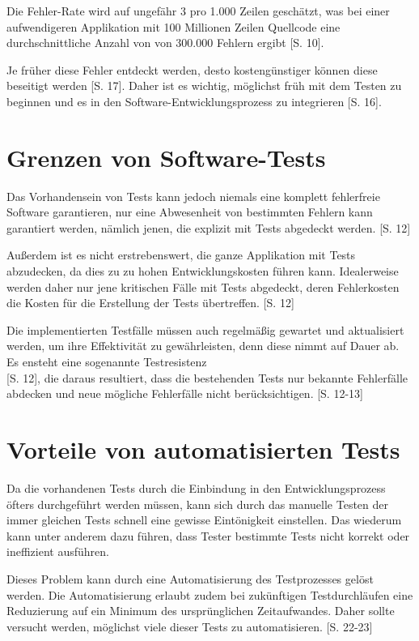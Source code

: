 \documentclass[a4paper,bibtotoc,oneside]{scrbook}
\begin{document}
Die Fehler-Rate wird auf ungefähr 3 pro 1.000 Zeilen geschätzt, was bei einer aufwendigeren Applikation mit 100 Millionen Zeilen Quellcode eine durchschnittliche Anzahl von von 300.000 Fehlern ergibt \cite{eval_regression}[S. 10]. 

Je früher diese Fehler entdeckt werden, desto kostengünstiger können diese beseitigt werden \cite{betrieb}[S. 17]. Daher ist es wichtig, möglichst früh mit dem Testen zu beginnen und es in den Software-Entwicklungsprozess zu integrieren \cite{betrieb}[S. 16]. 

\section{Grenzen von Software-Tests}
Das Vorhandensein von Tests kann jedoch niemals eine komplett fehlerfreie Software garantieren, nur eine Abwesenheit von bestimmten Fehlern kann garantiert werden, nämlich jenen, die explizit mit Tests abgedeckt werden. \cite{eval_regression}[S. 12]

Außerdem ist es nicht erstrebenswert, die ganze Applikation mit Tests abzudecken, da dies zu zu hohen Entwicklungskosten führen kann. Idealerweise werden daher nur jene kritischen Fälle mit Tests abgedeckt, deren Fehlerkosten die Kosten für die Erstellung der Tests übertreffen. \cite{eval_regression}[S. 12]

Die implementierten Testfälle müssen auch regelmäßig gewartet und aktualisiert werden, um ihre Effektivität zu gewährleisten, denn diese nimmt auf Dauer ab. Es ensteht eine sogenannte \glqq Testresistenz\grqq\\\cite{eval_regression}[S. 12], die daraus resultiert, dass die bestehenden Tests nur bekannte Fehlerfälle abdecken und neue mögliche Fehlerfälle nicht berücksichtigen. \cite{eval_regression}[S. 12-13]

\section{Vorteile von automatisierten Tests}
Da die vorhandenen Tests durch die Einbindung in den Entwicklungsprozess öfters durchgeführt werden müssen, kann sich durch das manuelle Testen der immer gleichen Tests schnell eine gewisse Eintönigkeit einstellen. Das wiederum kann unter anderem dazu führen, dass Tester bestimmte Tests nicht korrekt oder ineffizient ausführen. 

Dieses Problem kann durch eine Automatisierung des Testprozesses gelöst werden. Die Automatisierung erlaubt zudem bei zukünftigen Testdurchläufen eine Reduzierung auf ein Minimum des ursprünglichen Zeitaufwandes. Daher sollte versucht werden, möglichst viele dieser Tests zu automatisieren. \cite{test_auto}[S. 22-23]
\end{document}
